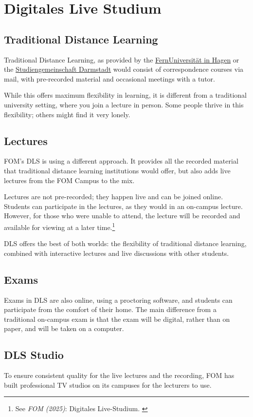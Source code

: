 %
%

\pagebreak
\section{Digitales Live Studium}

\onehalfspacing

\subsection{Traditional Distance Learning}

Traditional Distance Learning, as provided by the \href{https://www.fernuni-hagen.de/english/index.shtml}{FernUniversität in Hagen} or the \href{https://www.sgd.de/}{Studiengemeinschaft Darmstadt} would consist of correspondence courses via mail, with pre-recorded material and occasional meetings with a tutor.

While this offers maximum flexibility in learning, it is different from a traditional university setting, where you join a lecture in person. Some people thrive in this flexibility; others might find it very lonely.

\subsection{Lectures}

FOM's DLS is using a different approach. It provides all the recorded material that traditional distance learning institutions would offer, but also adds live lectures from the FOM Campus to the mix.

Lectures are not pre-recorded; they happen live and can be joined online. Students can participate in the lectures, as they would in an on-campus lecture. However, for those who were unable to attend, the lecture will be recorded and available for viewing at a later time.\footnote{See \textit{FOM (2025)}: Digitales Live-Studium. \cite{fomDls}}

DLS offers the best of both worlds: the flexibility of traditional distance learning, combined with interactive lectures and live discussions with other students.

\subsection{Exams}

Exams in DLS are also online, using a proctoring software, and students can participate from the comfort of their home. The main difference from a traditional on-campus exam is that the exam will be digital, rather than on paper, and will be taken on a computer.

\subsection{DLS Studio}

To ensure consistent quality for the live lectures and the recording, FOM has built professional TV studios on its campuses for the lecturers to use.
